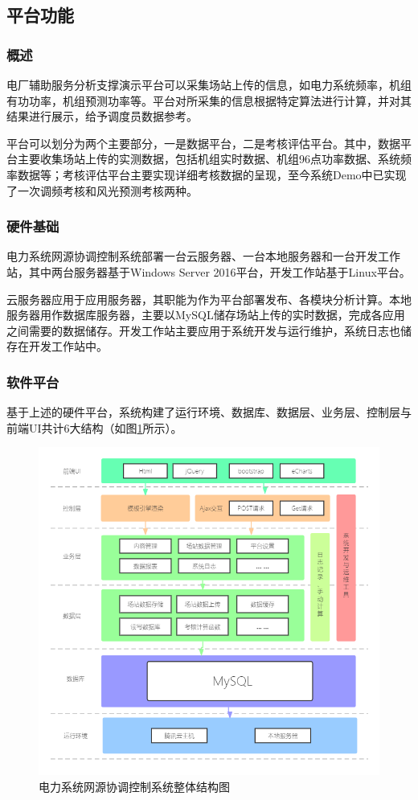 \documentclass[winfonts,UTF8,a4paper]{ctexart}
\begin{document}
\subsection{平台功能}
\subsubsection{概述}

电厂辅助服务分析支撑演示平台可以采集场站上传的信息，如电力系统频率，机组有功功率，机组预测功率等。平台对所采集的信息根据特定算法进行计算，并对其结果进行展示，给予调度员数据参考。

平台可以划分为两个主要部分，一是数据平台，二是考核评估平台。其中，数据平台主要收集场站上传的实测数据，包括机组实时数据、机组96点功率数据、系统频率数据等；考核评估平台主要实现详细考核数据的呈现，至今系统Demo中已实现了一次调频考核和风光预测考核两种。

\subsubsection{硬件基础}
电力系统网源协调控制系统部署一台云服务器、一台本地服务器和一台开发工作站，其中两台服务器基于Windows Server 2016平台，开发工作站基于Linux平台。

云服务器应用于应用服务器，其职能为作为平台部署发布、各模块分析计算。本地服务器用作数据库服务器，主要以MySQL储存场站上传的实时数据，完成各应用之间需要的数据储存。开发工作站主要应用于系统开发与运行维护，系统日志也储存在开发工作站中。

\subsubsection{软件平台}
基于上述的硬件平台，系统构建了运行环境、数据库、数据层、业务层、控制层与前端UI共计6大结构（如图\ref{电力系统网源协调控制系统整体结构图}所示）。
\begin{figure}[H]
	\centering
	\includegraphics[width=0.9\linewidth]{pic/系统框架结构}
	\caption{电力系统网源协调控制系统整体结构图}
	\label{电力系统网源协调控制系统整体结构图}
\end{figure}
\end{document}
